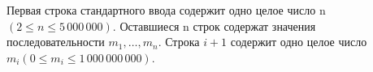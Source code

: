 Первая строка стандартного ввода содержит одно целое число n $(2 \le n \le 5\,000\,000)$. 
Оставшиеся n строк содержат значения последовательности $m_1, \ldots, m_n$. Строка $i + 1$ содержит одно целое число $m_i (0 \le m_i \le 1\,000\,000\,000)$.

